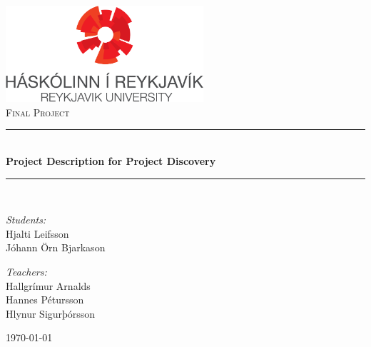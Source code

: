  \newcommand{\HRule}{\rule{\linewidth}{0.5mm}}
\begin{titlepage}

\begin{center}
\includegraphics[width=0.55\textwidth]{./rulogo}\\[4.0cm]    


\textsc{\LARGE Final Project}\\[0.5cm]

\HRule \\[0.4cm]
{ \Huge \bfseries Project Description for Project Discovery}\\[0.4cm]

\HRule \\[0.5cm]

\begin{minipage}{0.49\textwidth}
\begin{flushleft} \large
\emph{Students:}\\
Hjalti Leifsson \\
Jóhann Örn Bjarkason
\end{flushleft}
\end{minipage}
\begin{minipage}{0.49\textwidth}
\begin{flushright} \large
\emph{Teachers:} \\
Hallgrímur Arnalds \\
Hannes Pétursson \\
Hlynur Sigurþórsson
\end{flushright}
\end{minipage}

\vfill

{\large \today}



\end{center}

\end{titlepage}